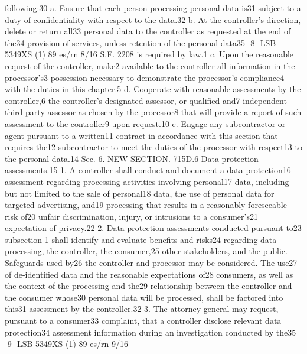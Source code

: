 following:30
a. Ensure that each person processing personal data is31
subject to a duty of confidentiality with respect to the data.32
b. At the controller’s direction, delete or return all33
personal data to the controller as requested at the end of the34
provision of services, unless retention of the personal data35
-8-
LSB 5349XS (1) 89
es/rn 8/16
S.F. 2208
is required by law.1
c. Upon the reasonable request of the controller, make2
available to the controller all information in the processor’s3
possession necessary to demonstrate the processor’s compliance4
with the duties in this chapter.5
d. Cooperate with reasonable assessments by the controller,6
the controller’s designated assessor, or qualified and7
independent third-party assessor as chosen by the processor8
that will provide a report of such assessment to the controller9
upon request.10
e. Engage any subcontractor or agent pursuant to a written11
contract in accordance with this section that requires the12
subcontractor to meet the duties of the processor with respect13
to the personal data.14
Sec. 6. NEW SECTION. 715D.6 Data protection assessments.15
1. A controller shall conduct and document a data protection16
assessment regarding processing activities involving personal17
data, including but not limited to the sale of personal18
data, the use of personal data for targeted advertising, and19
processing that results in a reasonably foreseeable risk of20
unfair discrimination, injury, or intrusions to a consumer’s21
expectation of privacy.22
2. Data protection assessments conducted pursuant to23
subsection 1 shall identify and evaluate benefits and risks24
regarding data processing, the controller, the consumer,25
other stakeholders, and the public. Safeguards used by26
the controller and processor may be considered. The use27
of de-identified data and the reasonable expectations of28
consumers, as well as the context of the processing and the29
relationship between the controller and the consumer whose30
personal data will be processed, shall be factored into this31
assessment by the controller.32
3. The attorney general may request, pursuant to a consumer33
complaint, that a controller disclose relevant data protection34
assessment information during an investigation conducted by the35
-9-
LSB 5349XS (1) 89
es/rn 9/16
